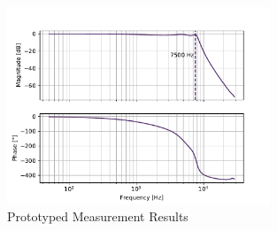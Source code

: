 \documentclass[11pt]{texMemo-gibbons}
\begin{document}
\begin{figure}[h!]
  \centering
  \includegraphics[width=0.7\textwidth]{../plots/measurement_results.pdf}
  \caption{Prototyped Measurement Results}
  \label{fig:meas}
\end{figure}
\end{document}
